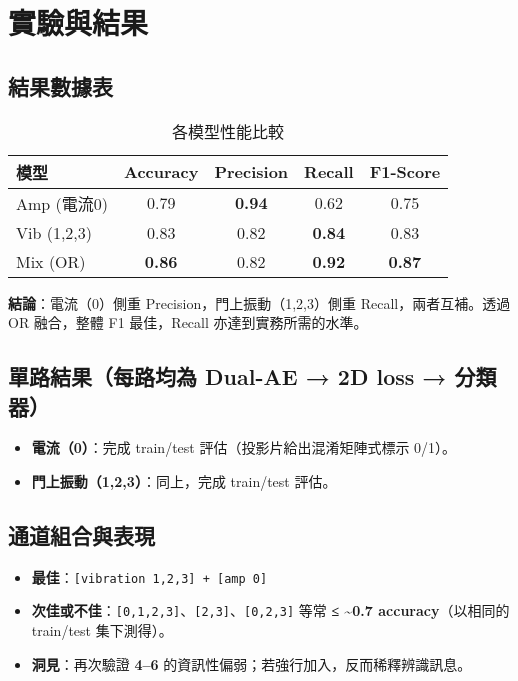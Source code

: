 \documentclass[12pt,a4paper]{article}
\begin{document}
\section{實驗與結果}

\subsection{結果數據表}

\begin{table}[H]
\centering
\caption{各模型性能比較}
\begin{tabular}{@{}lcccc@{}}
\toprule
模型 & Accuracy & Precision & Recall & F1-Score \\
\midrule
Amp (電流0) & 0.79 & \textbf{0.94} & 0.62 & 0.75 \\
Vib (1,2,3) & 0.83 & 0.82 & \textbf{0.84} & 0.83 \\
Mix (OR) & \textbf{0.86} & 0.82 & \textbf{0.92} & \textbf{0.87} \\
\bottomrule
\end{tabular}
\end{table}

\textbf{結論}：電流（0）側重 Precision，門上振動（1,2,3）側重 Recall，兩者互補。透過 OR 融合，整體 F1 最佳，Recall 亦達到實務所需的水準。

\subsection{單路結果（每路均為 Dual-AE → 2D loss → 分類器）}

\begin{itemize}
    \item \textbf{電流（0）}：完成 train/test 評估（投影片給出混淆矩陣式標示 0/1）。
    \item \textbf{門上振動（1,2,3）}：同上，完成 train/test 評估。
\end{itemize}

\subsection{通道組合與表現}

\begin{itemize}
    \item \textbf{最佳}：\texttt{[vibration 1,2,3] + [amp 0]}
    \item \textbf{次佳或不佳}：\texttt{[0,1,2,3]}、\texttt{[2,3]}、\texttt{[0,2,3]} 等常 \textbf{≤ \textasciitilde 0.7 accuracy}（以相同的 train/test 集下測得）。
    \item \textbf{洞見}：再次驗證 \textbf{4–6} 的資訊性偏弱；若強行加入，反而稀釋辨識訊息。
\end{itemize}
\end{document}
